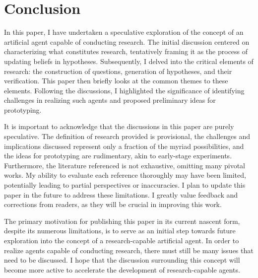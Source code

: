 \documentclass{article}
\begin{document}
\section{Conclusion}
In this paper, I have undertaken a speculative exploration of the concept of an artificial agent capable of conducting research. The initial discussion centered on characterizing what constitutes research, tentatively framing it as the process of updating beliefs in hypotheses. Subsequently, I delved into the critical elements of research: the construction of questions, generation of hypotheses, and their verification. This paper then briefly looks at the common themes to these elements. Following the discussions, I highlighted the significance of identifying challenges in realizing such agents and proposed preliminary ideas for prototyping.

It is important to acknowledge that the discussions in this paper are purely speculative. The definition of research provided is provisional, the challenges and implications discussed represent only a fraction of the myriad possibilities, and the ideas for prototyping are rudimentary, akin to early-stage experiments. Furthermore, the literature referenced is not exhaustive, omitting many pivotal works. My ability to evaluate each reference thoroughly may have been limited, potentially leading to partial perspectives or inaccuracies. I plan to update this paper in the future to address these limitations. I greatly value feedback and corrections from readers, as they will be crucial in improving this work.

The primary motivation for publishing this paper in its current nascent form, despite its  numerous limitations, is to serve as an initial step towards future exploration into the concept of a research-capable artificial agent. In order to realize agents capable of conducting research, there must still be many issues that need to be discussed. I hope that the discussion surrounding this concept will become more active to accelerate the development of research-capable agents.



\end{document}
